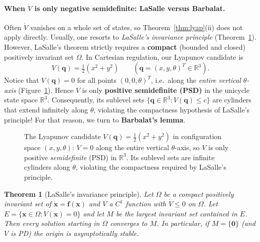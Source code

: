\documentclass[11pt,a4paper]{article}
\newcommand{\R}{\mathbb{R}}
\theoremstyle{plain}
\newtheorem{theorem}{Theorem}[section]
\theoremstyle{definition}
\theoremstyle{remark}
\begin{document}
\paragraph{When $\dot V$ is only negative semidefinite: LaSalle versus Barbalat.}
Often $\dot V$ vanishes on a whole set of states, so Theorem~\ref{thm:lyap}(ii) does not apply directly. Usually, one resorts to \emph{LaSalle's invariance principle} (Theorem~\ref{thm:lasalle}). However, LaSalle's theorem strictly requires a \textbf{compact} (bounded and closed) positively invariant set $\Omega$.
In Cartesian regulation, our Lyapunov candidate is
\[
V(\bm q)=\tfrac{1}{2}(x^2+y^2)\qquad (\bm q=(x,y,\theta)^T\in\R^3).
\]
Notice that $V(\bm q)=0$ for all points $(0,0,\theta)^T$, i.e.\ along the \emph{entire vertical $\theta$-axis} (Figure~\ref{fig:vpsd}). Hence $V$ is only \textbf{positive semidefinite (PSD)} in the unicycle state space $\R^3$. Consequently, its sublevel sets $\{\bm q\in\R^3 : V(\bm q)\le c\}$ are cylinders that extend infinitely along $\theta$, violating the compactness hypothesis of LaSalle's principle! For that reason, we turn to \textbf{Barbalat's lemma}.

\begin{figure}[ht]
\centering
{}
\caption{The Lyapunov candidate $V(\bm q)=\frac{1}{2}(x^2+y^2)$ in configuration space $(x,y,\theta)$: $V=0$ along the entire vertical $\theta$-axis, so $V$ is only positive \emph{semidefinite} (PSD) in $\R^3$. Its sublevel sets are infinite cylinders along $\theta$, violating the compactness required by LaSalle's principle.}
\label{fig:vpsd}
\end{figure}

\begin{theorem}[LaSalle's invariance principle]\label{thm:lasalle}
Let $\Omega$ be a compact positively invariant set of $\dot{\bm x}=\bm f(\bm x)$ and $V$ a $C^1$ function with $\dot V\le0$ on $\Omega$. Let $E=\{\bm x\in\Omega:\dot V(\bm x)=0\}$ and let $M$ be the largest invariant set contained in $E$. Then every solution starting in $\Omega$ converges to $M$. In particular, if $M=\{\bm 0\}$ (and $V$ is PD) the origin is asymptotically stable.
\end{theorem}
\end{document}
